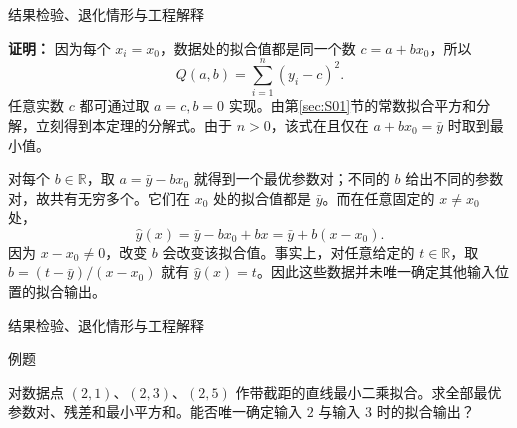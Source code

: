 \documentclass[aspectratio=169,10pt,fontset=fandol]{ctexbeamer}
\begin{document}
\begin{frame}[t,fragile]{结果检验、退化情形与工程解释}
\footnotesize
{\footnotesize
\textbf{证明：}
因为每个 $x_i=x_0$，数据处的拟合值都是同一个数 $c=a+bx_0$，所以
\[
Q(a,b)=\sum_{i=1}^{n}(y_i-c)^2.
\]
任意实数 $c$ 都可通过取 $a=c,b=0$ 实现。由第\ref{sec:S01}节的常数拟合平方和分解，立刻得到本定理的分解式。由于 $n>0$，该式在且仅在 $a+bx_0=\bar{y}$ 时取到最小值。

对每个 $b\in\mathbb{R}$，取 $a=\bar{y}-bx_0$ 就得到一个最优参数对；不同的 $b$ 给出不同的参数对，故共有无穷多个。它们在 $x_0$ 处的拟合值都是 $\bar{y}$。而在任意固定的 $x\ne x_0$ 处，
\[
\hat{y}(x)=\bar{y}-bx_0+bx=\bar{y}+b(x-x_0).
\]
因为 $x-x_0\ne0$，改变 $b$ 会改变该拟合值。事实上，对任意给定的 $t\in\mathbb{R}$，取 $b=(t-\bar{y})/(x-x_0)$ 就有 $\hat{y}(x)=t$。因此这些数据并未唯一确定其他输入位置的拟合输出。

}
\end{frame}
\begin{frame}[t,fragile]{结果检验、退化情形与工程解释}
\normalsize
\begin{block}{例题}
{\normalsize
对数据点 $(2,1)$、$(2,3)$、$(2,5)$ 作带截距的直线最小二乘拟合。求全部最优参数对、残差和最小平方和。能否唯一确定输入 $2$ 与输入 $3$ 时的拟合输出？

}
\end{block}
\end{frame}
\end{document}
